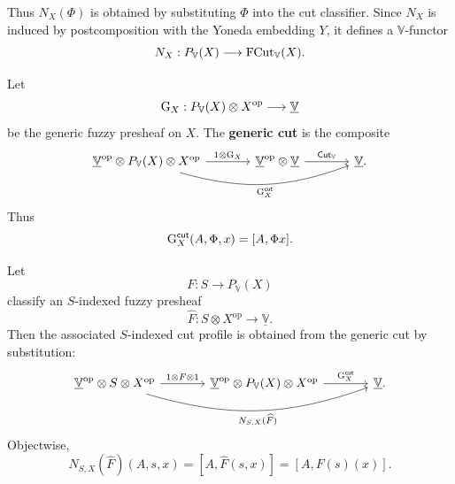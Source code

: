 Thus \(N_X(\Phi)\) is obtained by substituting \(\Phi\) into the cut classifier. Since \(N_X\) is induced by postcomposition with the Yoneda embedding \(Y\), it defines a
\(\mathbb V\)-functor
\[
    N_X:
    P_{\mathbb V}(X)
    \longrightarrow
    \operatorname{FCut}_{\mathbb V}(X).
\]

\begin{definition}
\label{def:generic-cut}
    Let
    \[
        \operatorname{G}_X:
        P_{\mathbb V}(X)\otimes X^{\mathrm{op}}
        \longrightarrow
        \underline{\mathbb V}
    \]
    be the generic fuzzy presheaf on \(X\). The
    \textbf{generic cut} is the composite
    \[
        \begin{tikzcd}[column sep=large,row sep=large]
            \underline{\mathbb V}^{\mathrm{op}}
            \otimes
            P_{\mathbb V}(X)
            \otimes
            X^{\mathrm{op}}
            \arrow[r,"1\otimes \Gen_X"]
            \arrow[rr,bend right=18,"\GCut_X"']
            &
            \underline{\mathbb V}^{\mathrm{op}}
            \otimes
            \underline{\mathbb V}
            \arrow[r,"\mathsf{Cut}_{\mathbb V}"]
            &
            \underline{\mathbb V}.
        \end{tikzcd}
    \]
    Thus
    \[
        \operatorname{G}^{\mathsf{cut}}_X(A,\Phi,x)=[A,\Phi x].
    \]
\end{definition}

\begin{proposition}
\label{prop:generic-cut-universal}
    Let
    \[
        F:S\to P_{\mathbb V}(X)
    \]
    classify an \(S\)-indexed fuzzy presheaf
    \[
        \widehat F:
        S\otimes X^{\mathrm{op}}
        \longrightarrow
        \underline{\mathbb V}.
    \]
    Then the associated \(S\)-indexed cut profile is obtained from the generic cut by substitution:
    \[
        \begin{tikzcd}[column sep=large,row sep=large]
            \underline{\mathbb V}^{\mathrm{op}}
            \otimes
            S
            \otimes
            X^{\mathrm{op}}
            \arrow[r,"1\otimes F\otimes 1"]
            \arrow[rr,bend right=18,"N_{S,X}(\widehat F)"']
            &
            \underline{\mathbb V}^{\mathrm{op}}
            \otimes
            P_{\mathbb V}(X)
            \otimes
            X^{\mathrm{op}}
            \arrow[r,"\GCut_X"]
            &
            \underline{\mathbb V}.
        \end{tikzcd}
    \]
    Objectwise,
    \[
        N_{S,X}(\widehat F)(A,s,x)
        =
        [A,\widehat F(s,x)]
        =
        [A,F(s)(x)].
    \]
\end{proposition}

